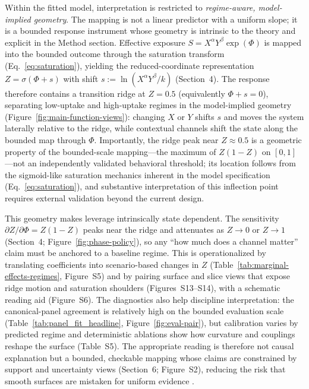 \documentclass[11pt]{article}
\begin{document}
Within the fitted model, interpretation is restricted to \emph{regime-aware, model-implied geometry}. The mapping is not a linear predictor with a uniform slope; it is a bounded response instrument whose geometry is intrinsic to the theory and explicit in the Method section. Effective exposure $S=X^{\alpha}Y^{\beta}\exp(\Phi)$ is mapped into the bounded outcome through the saturation transform (Eq.~\eqref{eq:saturation}), yielding the reduced-coordinate representation $Z=\sigma(\Phi+s)$ with shift $s:=\ln(X^{\alpha}Y^{\beta}/k)$ (Section~4). The response therefore contains a transition ridge at $Z=0.5$ (equivalently $\Phi+s=0$), separating low-uptake and high-uptake regimes in the model-implied geometry (Figure~\ref{fig:main-function-views}): changing $X$ or $Y$ shifts $s$ and moves the system laterally relative to the ridge, while contextual channels shift the state along the bounded map through $\Phi$. Importantly, the ridge peak near $Z \approx 0.5$ is a geometric property of the bounded-scale mapping---the maximum of $Z(1-Z)$ on $[0,1]$---not an independently validated behavioral threshold; its location follows from the sigmoid-like saturation mechanics inherent in the model specification (Eq.~\eqref{eq:saturation}), and substantive interpretation of this inflection point requires external validation beyond the current design.

This geometry makes leverage intrinsically state dependent. The sensitivity $\partial Z/\partial \Phi = Z(1-Z)$ peaks near the ridge and attenuates as $Z\rightarrow 0$ or $Z\rightarrow 1$ (Section~4; Figure~\ref{fig:phase-policy}), so any ``how much does a channel matter'' claim must be anchored to a baseline regime. This is operationalized by translating coefficients into scenario-based changes in $Z$ (Table~\ref{tab:marginal-effects-regimes}, Figure~S5) and by pairing surface and slice views that expose ridge motion and saturation shoulders (Figures~S13--S14), with a schematic reading aid (Figure~S6). The diagnostics also help discipline interpretation: the canonical-panel agreement is relatively high on the bounded evaluation scale (Table~\ref{tab:panel_fit_headline}, Figure~\ref{fig:eval-pair}), but calibration varies by predicted regime and deterministic ablations show how curvature and couplings reshape the surface (Table~S5). The appropriate reading is therefore not causal explanation but a bounded, checkable mapping whose claims are constrained by support and uncertainty views (Section~6; Figure~S2), reducing the risk that smooth surfaces are mistaken for uniform evidence \parencite{Peng2011Reproducible}.
\end{document}
